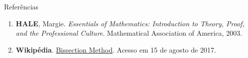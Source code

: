 \begin{frame}[fragile]{Referências}

    \begin{enumerate}
        \item \textbf{HALE}, Margie. \textit{Essentials of Mathematics: Introduction to Theory, Proof, and the Professional Culture}. Mathematical Association of America, 2003.

        \item \textbf{Wikipédia}. \href{https://en.wikipedia.org/wiki/Bisection_method}{Bissection Method}. Acesso em 15 de agosto de 2017.
    \end{enumerate}

\end{frame}
